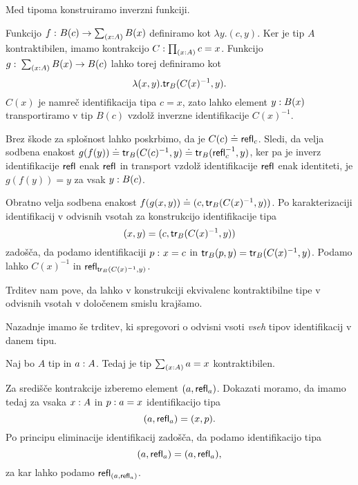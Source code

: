 \begin{dokaz}
  Med tipoma konstruiramo inverzni funkciji.

  Funkcijo \(f \,\colon B(c) \to \textstyle \sum_{\left( x : A \right)} B(x)\) definiramo kot \(\lambda y. (c, y)\). Ker je tip \(A\) kontraktibilen, imamo kontrakcijo \(C : \textstyle \prod_{\left( x : A \right)} c = x\).
  Funkcijo \(g \,\colon \textstyle \sum_{\left( x : A \right)} B(x) \to B(c)\) lahko torej definiramo kot
  \[\lambda (x, y).\textnormal{\textsf{tr}}_{B}(C(x)^{-1}, y).\]  \(C(x)\) je namreč identifikacija tipa \(c = x\), zato lahko element \(y : B(x)\) transportiramo v tip \(B(c)\) vzdolž inverzne identifikacije \(C(x)^{-1}\).

  Brez škode za splošnost lahko poskrbimo, da je \(C(c) \doteq \textnormal{\textsf{refl}}_{c}\). Sledi, da velja sodbena enakost \(g(f(y)) \doteq \textnormal{\textsf{tr}}_{B}(C(c)^{-1}, y) \doteq \textnormal{\textsf{tr}}_{B}(\textnormal{\textsf{refl}}_{c}^{-1}, y)\),  ker pa je inverz identifikacije \(\textnormal{\textsf{refl}}_{}\) enak \(\textnormal{\textsf{refl}}_{}\) in transport vzdolž identifikacije \(\textnormal{\textsf{refl}}_{}\) enak identiteti, je \(g(f(y)) = y\) za vsak \(y : B(c)\).

  Obratno velja sodbena enakost \(f(g(x, y)) \doteq (c, \textnormal{\textsf{tr}}_{B}(C(x)^{-1}, y))\). Po karakterizaciji identifikacij v odvisnih vsotah za konstrukcijo identifikacije tipa
  \[(x, y) = (c, \textnormal{\textsf{tr}}_{B}(C(x)^{-1}, y))\] zadošča, da podamo identifikaciji \(p \,\colon x = c\) in \(\textnormal{\textsf{tr}}_{B}(p, y) = \textnormal{\textsf{tr}}_{B}(C(x)^{-1}, y)\). Podamo lahko \(C(x)^{-1}\) in \(\textnormal{\textsf{refl}}_{\textnormal{\textsf{tr}}_{B}(C(x)^{-1}, y)}\).
\end{dokaz}

Trditev nam pove, da lahko v konstrukciji ekvivalenc kontraktibilne tipe v odvisnih vsotah v določenem smislu krajšamo.

Nazadnje imamo še trditev, ki spregovori o odvisni vsoti \emph{vseh} tipov identifikacij v danem tipu.

\begin{trditev}
  \label{cover-contr}
  Naj bo \(A\) tip in \(a : A\). Tedaj je tip \(\textstyle \sum_{\left( x : A \right)} a = x\) kontraktibilen.
\end{trditev}

\begin{dokaz}
  Za središče kontrakcije izberemo element \((a, \textnormal{\textsf{refl}}_{a})\). Dokazati moramo, da imamo tedaj za vsaka \(x : A\) in \(p : a = x\) identifikacijo tipa
  \[(a, \textnormal{\textsf{refl}}_{a}) = (x, p).\]
  Po principu eliminacije identifikacij zadošča, da podamo identifikacijo tipa
  \[(a, \textnormal{\textsf{refl}}_{a}) = (a, \textnormal{\textsf{refl}}_{a}),\] za kar lahko podamo \(\textnormal{\textsf{refl}}_{(a, \textnormal{\textsf{refl}}_{a})}\).
\end{dokaz}

